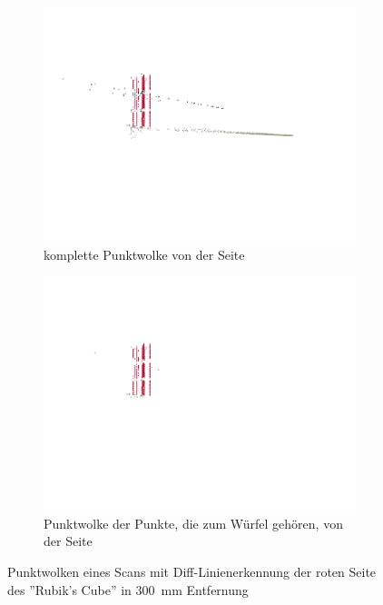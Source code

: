 \documentclass[ngerman,a4paper,parskip=half]{scrartcl}
\begin{document}
\begin{figure}[H]
\begin{subfigure}{0.45\textwidth}
		\includegraphics[width=\textwidth]{includes/diff_red_pos1.png}
		\caption{komplette Punktwolke von der Seite}
	\end{subfigure}
	\hfill
	\begin{subfigure}{0.45\textwidth}
		\includegraphics[width=\textwidth]{includes/diff_only_red_pos1.png}
		\caption{Punktwolke der Punkte, die zum Würfel gehören, von der Seite}
	\end{subfigure}
	\caption{Punktwolken eines Scans mit Diff-Linienerkennung der roten Seite des ''Rubik's Cube'' in 300~mm Entfernung}
\end{figure}
\end{document}
